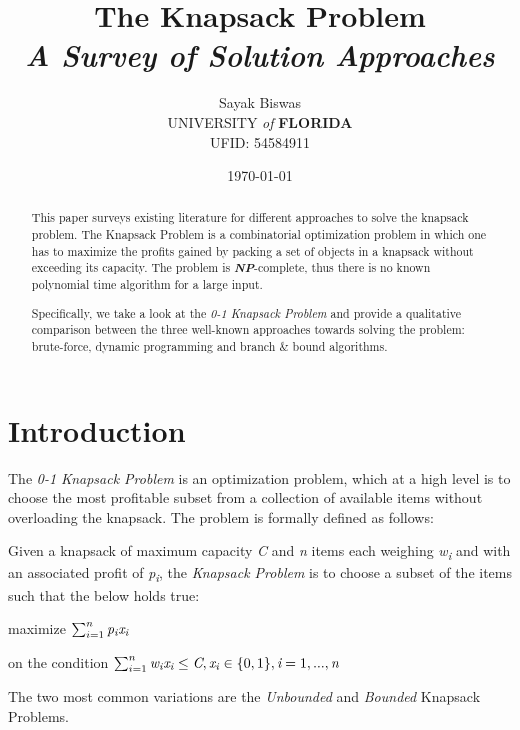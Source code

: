 \documentclass{article}
\title{The Knapsack Problem \\ \small \textit{A Survey of Solution Approaches}}
\date{\small \today}
\author{Sayak Biswas \\ \small UNIVERSITY \textit{of} \textbf{FLORIDA} \\ \small UFID: 54584911}
\begin{document}
\maketitle
\begin{abstract}
This paper surveys existing literature for different approaches to solve the knapsack problem. The Knapsack Problem is a combinatorial optimization problem in which one has to maximize the profits gained by packing a set of objects in a knapsack without exceeding its capacity. The problem is \textbf{\textit{NP}}-complete, thus there is no known polynomial time algorithm for a large input.

Specifically, we take a look at the \textit{0-1 Knapsack Problem} and provide a qualitative comparison between the three well-known approaches towards solving the problem: brute-force, dynamic programming and branch \& bound algorithms.
\end{abstract}
\newpage

\section{Introduction}
The \textit{0-1 Knapsack Problem} is an optimization problem, which at a high level is to choose the most profitable subset from a collection of available items without overloading the knapsack. The problem is formally defined as follows:

Given a knapsack of maximum capacity \textit{C} and \textit{n} items each weighing \textit{w\textsubscript{i}} and with an associated profit of \textit{p\textsubscript{i}}, the \textit{Knapsack Problem} is to choose a subset of the items such that the below holds true:

maximize $\sum_{i=1}^{n}\textit{p\textsubscript{i}x\textsubscript{i}}$

on the condition $\sum_{i=1}^{n}\textit{w\textsubscript{i}x\textsubscript{i}} \leq \textit{C}, \textit{x\textsubscript{i}} \in \{0, 1\}, \textit{i} = 1,...,\textit{n}$

The two most common variations are the \textit{Unbounded} and \textit{Bounded} Knapsack Problems. 

\end{document}
